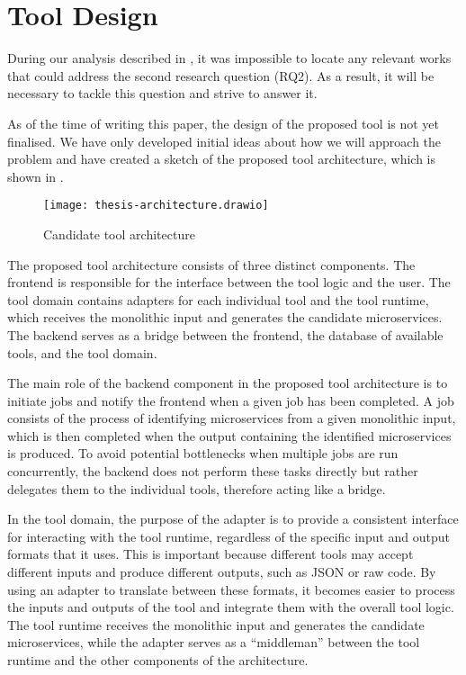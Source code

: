 \section{Tool Design}

During our analysis described in , it was
impossible to locate any relevant works that could address the second research
question (RQ2). As a result, it will be necessary to tackle this question and
strive to answer it.

As of the time of writing this paper, the design of the proposed tool is not
yet finalised. We have only developed initial ideas about how we will approach
the problem and have created a sketch of the proposed tool architecture, which
is shown in .

\begin{figure*}[!htb]
  \caption{Candidate tool architecture}
  \label{fig:tool-architecture}
  \centering
  \texttt{[image: thesis-architecture.drawio]}
\end{figure*}

The proposed tool architecture consists of three distinct components. The
frontend is responsible for the interface between the tool logic and the user.
The tool domain contains adapters for each individual tool and the tool
runtime, which receives the monolithic input and generates the candidate
microservices. The backend serves as a bridge between the frontend, the
database of available tools, and the tool domain.

The main role of the backend component in the proposed tool architecture is to
initiate jobs and notify the frontend when a given job has been completed. A
job consists of the process of identifying microservices from a given
monolithic input, which is then completed when the output containing the
identified microservices is produced. To avoid potential bottlenecks when
multiple jobs are run concurrently, the backend does not perform these tasks
directly but rather delegates them to the individual tools, therefore acting
like a bridge.

In the tool domain, the purpose of the adapter is to provide a consistent
interface for interacting with the tool runtime, regardless of the specific
input and output formats that it uses. This is important because different
tools may accept different inputs and produce different outputs, such as JSON
or raw code. By using an adapter to translate between these formats, it becomes
easier to process the inputs and outputs of the tool and integrate them with
the overall tool logic. The tool runtime receives the monolithic input and
generates the candidate microservices, while the adapter serves as a
``middleman'' between the tool runtime and the other components of the
architecture.

